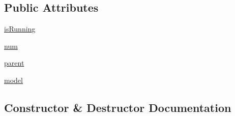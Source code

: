 \subsection*{Public Attributes}
\begin{DoxyCompactItemize}
\item 
\hyperlink{classinterface_1_1LOGITECH__GAMEPAD__INTERFACE_1_1LogitechGamepadInterface_aa4c3375b698d7fdf478ceac2444ec437}{is\+Running}
\item 
\hyperlink{classinterface_1_1LOGITECH__GAMEPAD__INTERFACE_1_1LogitechGamepadInterface_afe919de9303d9c9c6f60e8b8db0755dd}{num}
\item 
\hyperlink{classinterface_1_1LOGITECH__GAMEPAD__INTERFACE_1_1LogitechGamepadInterface_a1ef8059ab625cac977f6a17662f5c0d9}{parent}
\item 
\hyperlink{classinterface_1_1LOGITECH__GAMEPAD__INTERFACE_1_1LogitechGamepadInterface_a35a43bbcfe3d9aab28bf43e147a5384c}{model}
\end{DoxyCompactItemize}


\subsection{Constructor \& Destructor Documentation}
\hypertarget{classinterface_1_1LOGITECH__GAMEPAD__INTERFACE_1_1LogitechGamepadInterface_ae9cbbecadf735d90cf9834b4df772d2d}{}
